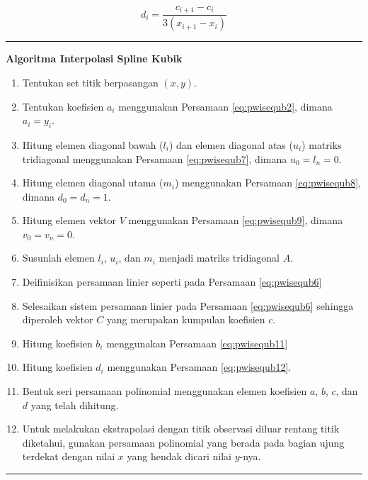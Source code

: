 \documentclass[
]{book}
\providecommand{\tightlist}{%
  \setlength{\itemsep}{0pt}\setlength{\parskip}{0pt}}
\theoremstyle{definition}
\theoremstyle{definition}
\theoremstyle{definition}
\theoremstyle{definition}
\theoremstyle{remark}
\begin{document}
\begin{equation}
d_i=\frac{c_{i+1}-c_i}{3\left(x_{i+1}-x_i\right)}
  \label{eq:pwisequb12}
\end{equation}

\begin{center}\rule{0.5\linewidth}{0.5pt}\end{center}

\textbf{Algoritma Interpolasi Spline Kubik}

\begin{enumerate}
\def\labelenumi{\arabic{enumi}.}
\tightlist
\item
  Tentukan set titik berpasangan \(\left(x,y\right)\).
\item
  Tentukan koefisien \(a_i\) menggunakan Persamaan \eqref{eq:pwisequb2}, dimana \(a_i = y_i\).
\item
  Hitung elemen diagonal bawah (\(l_i\)) dan elemen diagonal atas (\(u_i\)) matriks tridiagonal menggunakan Persamaan \eqref{eq:pwisequb7}, dimana \(u_0=l_n=0\).
\item
  Hitung elemen diagonal utama (\(m_i\)) menggunakan Persamaan \eqref{eq:pwisequb8}, dimana \(d_0=d_n=1\).
\item
  Hitung elemen vektor \(V\) menggunakan Persamaan \eqref{eq:pwisequb9}, dimana \(v_0=v_n=0\).
\item
  Susunlah elemen \(l_i\), \(u_i\), dan \(m_i\) menjadi matriks tridiagonal \(A\).
\item
  Deifinisikan persamaan linier seperti pada Persamaan \eqref{eq:pwisequb6}
\item
  Selesaikan sistem persamaan linier pada Persamaan \eqref{eq:pwisequb6} sehingga diperoleh vektor \(C\) yang merupakan kumpulan koefisien \(c\).
\item
  Hitung koefisien \(b_i\) menggunakan Persamaan \eqref{eq:pwisequb11}
\item
  Hitung koefisien \(d_i\) menggunakan Persamaan \eqref{eq:pwisequb12}.
\item
  Bentuk seri persamaan polinomial menggunakan elemen koefisien \(a\), \(b\), \(c\), dan \(d\) yang telah dihitung.
\item
  Untuk melakukan ekstrapolasi dengan titik observasi diluar rentang titik diketahui, gunakan persamaan polinomial yang berada pada bagian ujung terdekat dengan nilai \(x\) yang hendak dicari nilai \(y\)-nya.
\end{enumerate}

\begin{center}\rule{0.5\linewidth}{0.5pt}\end{center}
\end{document}
